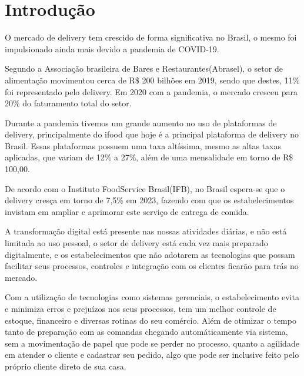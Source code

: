 \chapter{Introdução}
O mercado de delivery tem crescido de forma significativa no Brasil, o mesmo foi impulsionado ainda mais 
devido a pandemia de COVID-19. 

Segundo a Associação brasileira de Bares e Restaurantes(Abrasel), o setor de alimentação movimentou cerca
de R\$ 200 bilhões em 2019, sendo que destes, 11\% foi representado pelo delivery. Em 2020 com a pandemia, o
mercado cresceu para 20\% do faturamento total do setor\cite{abraselexpansao}.

Durante a pandemia tivemos um grande aumento no uso de plataformas de delivery, principalmente
do ifood\cite{ifoodprincipal} que hoje é a principal plataforma de delivery no Brasil. Essas plataformas possuem
uma taxa altíssima, mesmo as altas taxas aplicadas, que variam de 12\% a 27\%, além de uma
mensalidade em torno de R\$ 100,00\cite{ifoodtaxa}.

De acordo com o Instituto FoodService Brasil(IFB), no Brasil espera-se que o delivery cresça em torno de 7,5\% em 2023,
fazendo com que os estabelecimentos invistam em ampliar e aprimorar este serviço de entrega de comida\cite{ifb2023}.

A transformação digital\cite{transformacaodigital} está presente nas nossas atividades diárias, e não está limitada ao uso pessoal, o setor 
de delivery está cada vez mais preparado digitalmente, e os estabelecimentos que não adotarem as tecnologias que 
possam facilitar seus processos, controles e integração com os clientes ficarão para trás no mercado. 

Com a utilização de tecnologias como sistemas gerenciais, o estabelecimento evita e minimiza erros e prejuízos nos 
seus processos, tem um melhor controle de estoque, financeiro e diversas rotinas do seu comércio. Além de otimizar
o tempo tanto de preparação com as comandas chegando automáticamente via sistema, sem a movimentação de papel que 
pode se perder no processo, quanto a agilidade em atender o cliente e cadastrar seu pedido, algo que pode ser inclusive
feito pelo próprio cliente direto de sua casa.